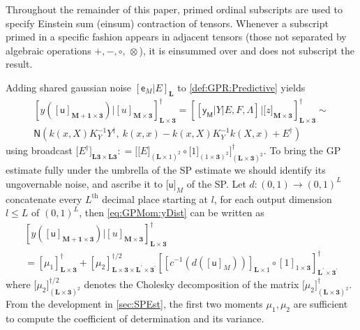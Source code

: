 \documentclass[preprint,12pt]{elsarticle}
\newcommand*{\M}[1]{\ensuremath{#1}\xspace}
\newcommand*{\x}{\times}
\newcommand*{\mi}[1]{\mathbf{#1}}
\newcommand*{\rv}[1]{\mathsf{#1}}
\newcommand*{\te}[2][]{\left\lbrack{#2}\right\rbrack_{#1}}
\newcommand*{\tte}[2][]{\lbrack{#2}\rbrack_{#1}}
\newcommand*{\deq}{\M{\mathrel{\mathop:}=}}
\newcommand*{\gauss}[2]{\mathsf{N}\!\left({#1,#2}\right)}
\begin{document}
    Throughout the remainder of this paper, primed ordinal subscripts are used to specify Einstein sum (einsum) contraction of tensors. Whenever a subscript primed in a specific fashion appears in adjacent tensors (those not separated by algebraic operations $+,-,\circ,\,\otimes$), it is einsummed over and does not subscript the result.
    
    Adding shared gaussian noise $\te[\mi{L}]{\rv{e}_M\vert E}$ to \cref{def:GPR:Predictive} yields
    \begin{multline}\label{eq:GPMom:yDist}
        \te[\mi{L\x 3}]{y(\te[\mi{M+1\x 3}]{\rv{u}}) \big\vert \te[\mi{M\x 3}]{u}}^{\dagger} 
        = \te[\mi{L\x 3}]{\te{\rv{y_M} \vert Y \vert E,F,\Lambda} \big\vert \tte[\mi{M\x 3}]{z}}^{\dagger} \sim \\
        \gauss{k(x,X) K_{Y}^{-1} Y^{\dagger}}{\ k(x,x) - k(x,X) K_{Y}^{-1} k(X,x) + E^{\dagger}}
    \end{multline}
    using broadcast $\tte[\mi{L3\x L3}]{E^{\dagger}} \deq \tte[(\mi{L\x 3})^{2}]{\tte[(\mi{L}\x 1)^{2}]{E} \circ \tte[(1\x\mi{3})^{2}]{1}}^{\dagger}$. 
    To bring the GP estimate fully under the umbrella of the SP estimate we should identify its ungovernable noise, and ascribe it to $\tte[M]{\rv{u}}$ of the SP.
    Let $d\colon (0,1) \to (0,1)^{L}$ concatenate every $L^{\mathrm{th}}$ decimal place starting at $l$, for each output dimension $l\leq L$ of $(0,1)^{L}$, then \cref{eq:GPMom:yDist} can be written as
    \begin{multline}\label{eq:GPMom:yReveal}
        \te[\mi{L\x 3}]{y(\te[\mi{M+1\x 3}]{\rv{u}}) \big\vert \te[\mi{M\x 3}]{u}}^{\dagger} \\
        = \te[\mi{L\x 3}]{\mu_{1}}^{\dagger}
        + \te[\mi{L\x 3\x L^{\prime}\x 3^{\prime}}]{\mu_{2}}^{\dagger/2} \te[\mi{L^{\prime}\x 3^{\prime}}]{\te[\mi{L}\x 1]{c^{-1}\!\left(d\left(\te[M]{\rv{u}}\right)\right)} \circ \te[1\x\mi{3}]{1}}^{\dagger}
    \end{multline}
    where $\tte[(\mi{L\x 3})^{2}]{\mu_{2}}^{\dagger/2}$ denotes the Cholesky decomposition of the matrix $\tte[(\mi{L\x 3})^{2}]{\mu_{2}}^{\dagger}$.
    From the development in \cref{sec:SPEst}, the first two moments $\mu_{1},\mu_{2}$ are sufficient to compute the coefficient of determination and its variance. 
    
\end{document}
